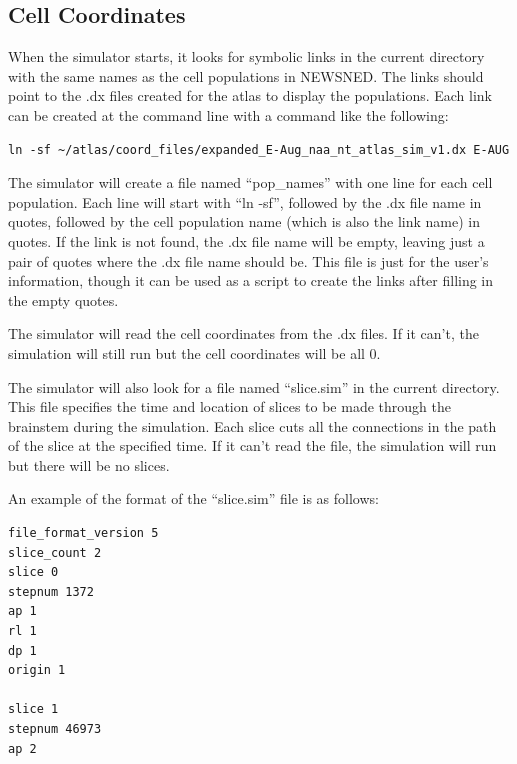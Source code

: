 \documentclass[12pt,openany,oneside]{book}
\begin{document}
\subsection{Cell Coordinates}

When the simulator starts, it looks for symbolic links in the current
directory with the same names as the cell populations in NEWSNED.  The
links should point to the .dx files created for the atlas to display
the populations.  Each link can be created at the command line with a
command like the following:

\begin{verbatim}
ln -sf ~/atlas/coord_files/expanded_E-Aug_naa_nt_atlas_sim_v1.dx E-AUG
\end{verbatim}

The simulator will create a file named ``pop\_names'' with one line for
each cell population.  Each line will start with ``ln -sf'', followed
by the .dx file name in quotes, followed by the cell population name
(which is also the link name) in quotes.  If the link is not found,
the .dx file name will be empty, leaving just a pair of quotes where
the .dx file name should be.  This file is just for the user's
information, though it can be used as a script to create the links
after filling in the empty quotes.

The simulator will read the cell coordinates from the .dx files.  If
it can't, the simulation will still run but the cell coordinates will
be all 0.

The simulator will also look for a file named ``slice.sim'' in the
current directory.  This file specifies the time and location of
slices to be made through the brainstem during the simulation.  Each
slice cuts all the connections in the path of the slice at the
specified time.  If it can't read the file, the simulation will run
but there will be no slices.
\filbreak

An example of the format of the ``slice.sim'' file is as follows:

\begin{Verbatim}[frame=single]
file_format_version 5
slice_count 2
slice 0
stepnum 1372
ap 1
rl 1
dp 1
origin 1

slice 1
stepnum 46973
ap 2

\end{Verbatim}
\end{document}
